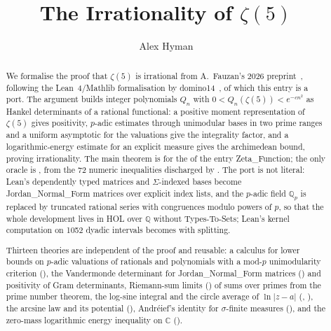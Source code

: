 \documentclass[11pt,a4paper]{article}
\begin{document}
\title{The Irrationality of $\zeta(5)$}
\author{Alex Hyman}
\maketitle

\begin{abstract}\sloppy
We formalise the proof that $\zeta(5)$ is irrational from A.~Fauzan's 2026 preprint~\cite{fauzan},
following the Lean~4/Mathlib formalisation by domino14~\cite{lean}, of which this entry is a
port.  The argument builds integer polynomials
$Q_n$ with $0 < Q_n(\zeta(5)) < e^{-cn^2}$ as Hankel determinants of a rational functional: a
positive moment representation of $\zeta(5)$ gives positivity, $p$-adic estimates through
unimodular bases in two prime ranges and a uniform asymptotic for the valuations give the
integrality factor, and a logarithmic-energy estimate for an explicit measure gives the
archimedean bound, proving irrationality.  The main theorem is 
for the  of the entry Zeta\_\allowbreak Function; the only oracle is , from the 72 numeric
inequalities discharged by .  The port is not literal: Lean's dependently typed
 matrices and $\Sigma$-indexed bases become Jordan\_\allowbreak Normal\_\allowbreak Form
matrices over explicit index lists, and the $p$-adic field $\mathbb{Q}_p$ is replaced by truncated
rational series with congruences modulo powers of $p$, so that the whole development lives in HOL
over $\mathbb{Q}$ without Types-To-Sets; Lean's kernel computation on 1052 dyadic intervals becomes
 with splitting.

Thirteen theories are independent of the proof and reusable: a calculus for lower bounds on
$p$-adic valuations of rationals and polynomials with a mod-$p$ unimodularity criterion
(), the Vandermonde determinant for Jordan\_\allowbreak Normal\_\allowbreak Form matrices
() and positivity of Gram determinants, Riemann-sum limits
() of sums over primes from the prime number theorem, the
log-sine integral and the circle average of $\ln|z-a|$ (,
), the arcsine law
and its potential (), Andr\'eief's identity for $\sigma$-finite measures
(), and the zero-mass logarithmic energy inequality on $\mathbb{C}$
().


\end{abstract}
\end{document}
